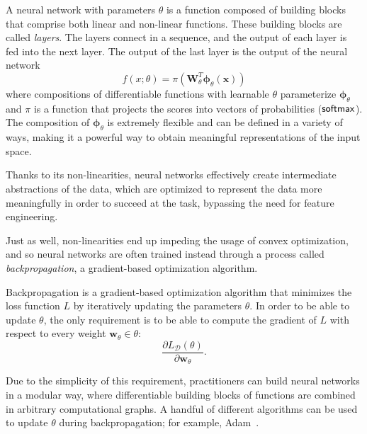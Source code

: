 \begin{definition}
    A neural network with parameters $\theta$ is a function
    composed of building blocks that comprise both linear and non-linear
    functions. These building blocks are called \textit{layers}.
    The layers connect in a sequence, and the output of each
    layer is fed into the next layer. The output of the last layer is
    the output of the neural network
    \begin{equation}
        f(x; \theta) = \pi 
        \left(\bm{W}_{\theta}^T\bm{\phi}_{\theta}\left(\bm{x}\right)\right)
    \end{equation}
    where compositions of differentiable functions with learnable
    $\theta$ parameterize $\bm{\phi}_{\theta}$ and $\pi$ is a
    function that projects the scores into vectors of probabilities (\eg $\operatorname*{\mathsf{softmax}}$).
    The composition of $\bm{\phi}_{\theta}$ is extremely flexible and
    can be defined in a variety of ways, making it a powerful way to
    obtain meaningful representations of the input space.
\end{definition}
%
Thanks to its non-linearities, neural networks effectively create
intermediate abstractions of the data, which are optimized to represent the data
more meaningfully in order to succeed at the task, bypassing the need
for feature engineering.

Just as well, non-linearities end up
impeding the usage of convex optimization, and so neural networks are
often trained instead through a process called
\textit{backpropagation}, a gradient-based optimization algorithm.

\begin{definition}[backpropagation]
    Backpropagation is a gradient-based optimization algorithm that
    minimizes the loss function $L$ by iteratively updating the
    parameters $\theta$. In order to be able to update $\theta$,
    the only requirement is to be able to compute the gradient of
    $L$ with respect to every weight $\bm{w}_\theta\in\theta$:
    \begin{equation}
        \frac{\partial L_{\mathcal{D}}(\theta)}{\partial \bm{w}_\theta}.
    \end{equation}
\end{definition}

Due to the simplicity of this requirement, practitioners can build
neural networks in a modular way, where differentiable building
blocks of functions are combined in arbitrary computational graphs. A
handful of different algorithms can be used to update $\theta$ during
backpropagation; for example, Adam~\citep{kingma2014adam}.

